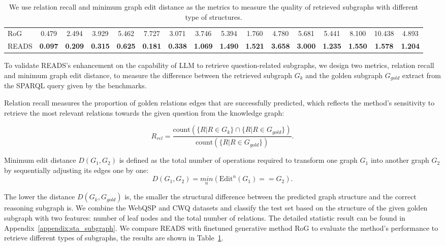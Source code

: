 \documentclass[11pt]{article}
\begin{document}
\begin{table}[h]
{\begin{tabular}{lccccccccccccccc}
\multicolumn{1}{l|}{RoG}                  & 0.479          & 2.494          & 3.929          & 5.462          & \multicolumn{1}{c|}{7.727}          & 3.071          & 3.746          & \multicolumn{1}{c|}{5.394}          & 1.760          & 4.780          & \multicolumn{1}{c|}{5.681}          & 5.441          & 8.100          & \multicolumn{1}{c|}{10.438}         & 4.893                          \\
\multicolumn{1}{l|}{READS}          & \textbf{0.097} & \textbf{0.209} & \textbf{0.315} & \textbf{0.625} & \multicolumn{1}{c|}{\textbf{0.181}} & \textbf{0.338} & \textbf{1.069} & \multicolumn{1}{c|}{\textbf{1.490}} & \textbf{1.521} & \textbf{3.658} & \multicolumn{1}{c|}{\textbf{3.000}} & \textbf{1.235} & \textbf{1.550} & \multicolumn{1}{c|}{\textbf{1.578}} & \textbf{1.204}                 \\ \bottomrule[1pt]
\end{tabular}
}
\caption{We use relation recall and minimum graph edit distance as the metrics to measure the quality of retrieved subgraphs with different type of structures.}
\label{table2}
\end{table}

To validate READS's enhancement on the capability of LLM to retrieve question-related subgraphs, we design two metrics, relation recall and minimum graph edit distance, to measure the difference between the retrieved subgraph $G_{k}$ and the golden subgraph $G_{gold}$ extract from the SPARQL query given by the benchmarks.

Relation recall measures the proportion of golden relations edges that are successfully predicted, which reflects the method's sensitivity to retrieve the most relevant relations towards the given question from the knowledge graph:

{\small
\begin{equation}
R_{rel} = \frac{\text{count}(\{R|R\in G_{k}\}\cap \{R|R\in G_{gold} \})}{\text{count}(\{R|R\in G_{gold}\})}.
\end{equation}
}

Minimum edit distance $D(G_{1},G_{2})$ is defined as the total number of operations required to transform one graph $G_{1}$ into another graph $G_{2}$ by sequentially adjusting its edges one by one:
{
\begin{equation}
D(G_{1},G_{2}) = \underset{n}{min} (\text{Edit}^{n}(G_{1})==G_{2}).
\end{equation}
}

The lower the distance $D(G_{k},G_{gold})$ is, the smaller the structural difference between the predicted graph structure and the correct reasoning subgraph is. We combine the WebQSP and CWQ datasets and classify the test set based on the structure of the given golden subgraph with two features: number of leaf nodes and the total number of relations. The detailed statistic result can be found in Appendix~\ref{appendix:sta_subgraph}. We compare READS with finetuned generative method RoG to evaluate the method's performance to retrieve different types of subgraphs, the results are shown in Table~\ref{table2}.
\end{document}
